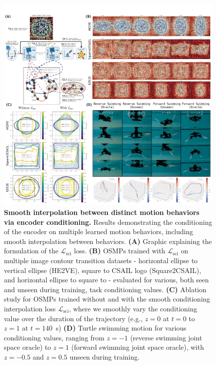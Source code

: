 \begin{figure}[h]
    \centering
    \includegraphics[width=1.0\linewidth]{osmp/figures/conditioning_results/conditioning_results_v2_compressed.pdf}
    \caption{
    \textbf{Smooth interpolation between distinct motion behaviors via encoder conditioning.}
    Results demonstrating the conditioning of the encoder on multiple learned motion behaviors, including smooth interpolation between behaviors.
    \textbf{(A)} Graphic explaining the formulation of the $\mathcal{L}_\mathrm{sci}$ loss.
    \textbf{(B)} \glspl{OSMP} trained with $\mathcal{L}_\mathrm{sci}$ on multiple image contour transition datasets - horizontal ellipse to vertical ellipse (HE2VE), square to CSAIL logo (Square2CSAIL), and horizontal ellipse to square to - evaluated for various, both seen and unseen during training, task conditioning values. 
    \textbf{(C)} Ablation study for \glspl{OSMP} trained without and with the smooth conditioning interpolation loss $\mathcal{L}_\mathrm{sci}$, where we smoothly vary the conditioning value over the duration of the trajectory (e.g., $z=0$ at $t=0$ to $z=1$ at $t=140$~s)
    \textbf{(D)} Turtle swimming motion for various conditioning values, ranging from $z=-1$ (reverse swimming joint space oracle) to $z=1$ (forward swimming joint space oracle), with $z=-0.5$ and $z=0.5$ unseen during training.
    }
    \label{fig:osmp:conditioning_results}
\end{figure}

